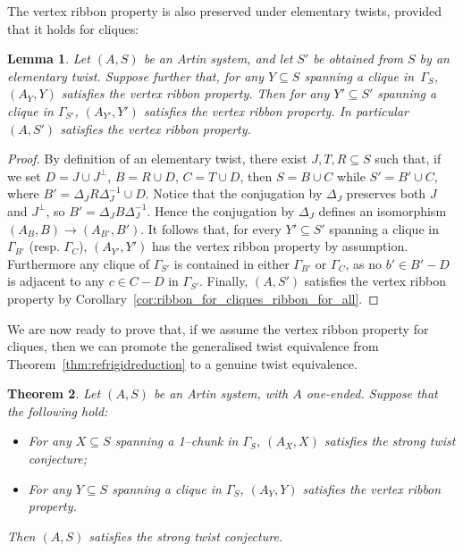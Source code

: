 \documentclass[svgnames]{amsart}
\theoremstyle{plain}
\newtheorem{thm}{Theorem}[section]
\newtheorem{lemma}[thm]{Lemma}
\theoremstyle{definition}
\begin{document}
\noindent The vertex ribbon property is also preserved under elementary twists, provided that it holds for cliques:
\begin{lemma}\label{lem:ribbons_preserved_under_twist}
    Let $(A,S)$ be an Artin system, and let $S'$ be obtained from $S$ by an elementary twist. Suppose further that, for any $Y \subseteq S$ spanning a clique in~$\Gamma_S$, $(A_Y,Y)$ satisfies the vertex ribbon property. Then for any $Y' \subseteq S'$ spanning a clique in $\Gamma_{S'}$, $(A_{Y'},Y')$ satisfies the vertex ribbon property. In particular $(A,S')$ satisfies the vertex ribbon property.
\end{lemma}

\begin{proof}
    By definition of an elementary twist, there exist $J,T,R\subseteq S$ such that, if we set $D=J\cup J^\bot$, $B=R\cup D$, $C=T\cup D$, then $S=B\cup C$ while $S'=B'\cup C$, where $B'=\Delta_J R\Delta_J^{-1} \cup D$. Notice that the conjugation by $\Delta_J$ preserves both $J$ and $J^{\bot}$, so $B'=\Delta_J B\Delta_J^{-1}$. Hence the conjugation by $\Delta_J$ defines an isomorphism $(A_B,B)\to (A_{B'},B')$. It follows that, for every $Y'\subseteq S'$ spanning a clique in $\Gamma_{B'}$ (resp. $\Gamma_C$), $(A_{Y'}, Y')$ has the vertex ribbon property by assumption. Furthermore any clique of $\Gamma_{S'}$ is contained in either $\Gamma_{B'}$ or $\Gamma_C$, as no $b'\in B'-D$ is adjacent to any $c\in C-D$ in $\Gamma_{S'}$. Finally, $(A,S')$ satisfies the vertex ribbon property by Corollary~\ref{cor:ribbon_for_cliques_ribbon_for_all}.
\end{proof}







\noindent We are now ready to prove that, if we assume the vertex ribbon property for cliques, then we can promote the generalised twist equivalence from Theorem~\ref{thm:refrigidreduction} to a genuine twist equivalence.

\begin{thm}\label{thm:strong+ribbon=strong}
    Let $(A,S)$ be an Artin system, with $A$ one-ended. Suppose that the following hold:
    \begin{itemize}
        \item For any $X\subseteq S$ spanning a 1--chunk in $\Gamma_S$, $(A_X,X)$ satisfies the strong twist conjecture;
        \item For any $Y\subseteq S$ spanning a clique in $\Gamma_S$, $(A_Y,Y)$ satisfies the vertex ribbon property.
    \end{itemize} 
    Then $(A,S)$ satisfies the strong twist conjecture.
\end{thm}
\end{document}
